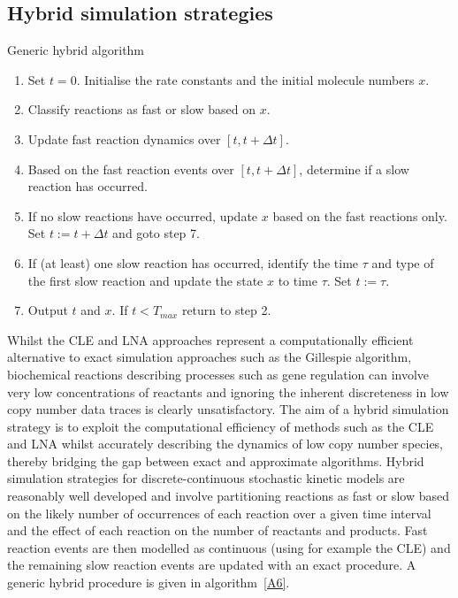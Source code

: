 \documentclass[12pt, DIV12]{scrartcl}
\begin{document}
\subsection{Hybrid simulation strategies}

\begin{algorithm}[t]
\caption{Generic hybrid algorithm}\label{A6}
\begin{enumerate}
\item Set $t=0$. Initialise the rate constants and the initial molecule numbers $x$. 
\item Classify reactions as fast or slow based on $x$.
\item Update fast reaction dynamics over $[t,t+\Delta t]$.
\item Based on the fast reaction events over $[t,t+\Delta t]$, determine if a
  slow reaction has occurred.
\item If no slow reactions have occurred, update $x$ based on the fast reactions
  only. Set $t:=t+\Delta t$ and goto step 7.
\item If (at least) one slow reaction has occurred, identify the time $\tau$ and
  type of the first slow reaction and update the state $x$ to time $\tau$. Set
  $t:=\tau$.
\item Output $t$ and $x$. If $t<T_{max}$ return to step 2.
\end{enumerate}
\end{algorithm}  

Whilst the CLE and LNA approaches represent a computationally efficient
alternative to exact simulation approaches such as the Gillespie algorithm,
biochemical reactions describing processes such as gene regulation can involve
very low concentrations of reactants \cite{guptasarma1995} and ignoring the
inherent discreteness in low copy number data traces is clearly unsatisfactory.
The aim of a hybrid simulation strategy is to exploit the computational
efficiency of methods such as the CLE and LNA whilst accurately describing the
dynamics of low copy number species, thereby bridging the gap between exact and
approximate algorithms. Hybrid simulation strategies for discrete-continuous
stochastic kinetic models are reasonably well developed and involve partitioning
reactions as fast or slow based on the likely number of occurrences of each
reaction over a given time interval and the effect of each reaction on the
number of reactants and products. Fast reaction events are then modelled as
continuous (using for example the CLE) and the remaining slow reaction events
are updated with an exact procedure. A generic hybrid procedure is given in
algorithm~\ref{A6}.
\end{document}
